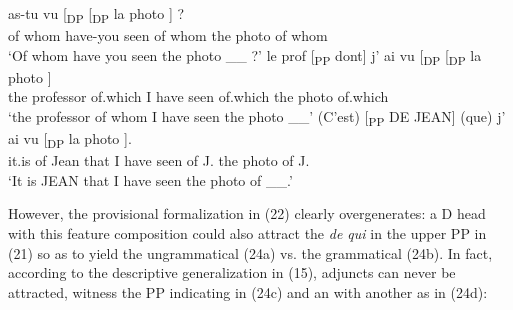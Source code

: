 \documentclass[output=paper]{langsci/langscibook}
\begin{document}
\ea%
    \label{ex:mensch:23}
    \ea
    \gll {}  as-tu  vu [\textsubscript{DP} \soutp{[\textsubscript{PP}}{2}   \soute{qui]} [\textsubscript{DP}   la  photo \soutp{[\textsubscript{PP}}{2}  \soute{qui]}] ?\\
       {}  of whom  have-you  seen  {} {}  of whom {}  the  photo   {}     of whom\\
    \glt ‘Of whom have you seen the photo \_\_ ?’
    \ex  
    \gll le  prof [\textsubscript{PP}  dont]    j’  ai  vu [\textsubscript{DP} \soutp{[\textsubscript{PP}}{2}  \soute{dont]} [\textsubscript{DP}  la   photo  \soutp{[\textsubscript{PP}}{2} \soute{dont]}] \\
         the  professor {}  of.which  I  have  seen {} {}   of.which {}  the      photo  {}  of.which\\
    \glt ‘the professor of whom I have seen the photo \_\_’
    \ex  
    \gll (C’est) [\textsubscript{PP} DE JEAN]   (que)  j’ ai  vu   [\textsubscript{DP} \soutp{[\textsubscript{PP}}{2}  \soute{Jean]}  la  photo \soutp{[\textsubscript{PP}}{2}  \soute{Jean]}].\footnotemark\\
         it.is {}  of  Jean    that  I have seen {} {}  of J.    the  photo {}     of J.\\
    \glt ‘It is JEAN that I have seen the photo of \_\_.’
    \z
\z
{}

However, the provisional formalization in (22) clearly overgenerates: a D head with this feature composition could also attract the  \textit{de qui} in the upper PP in (21) so as to yield the ungrammatical (24a) vs. the grammatical (24b). In fact, according to the descriptive generalization in (15), adjuncts can never be attracted, witness the PP indicating \SOURCE in (24c) and an  with another  as in (24d):
\end{document}

